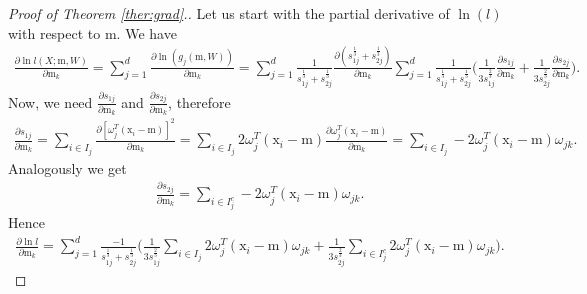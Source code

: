 \documentclass[12pt]{article}
\def\w{\omega}
\def\v{\mathrm{V}}
\def\x{\mathrm{x}}
\def\m{\mathrm{m}}
\theoremstyle{definition}
\begin{document}
\begin{proof}[Proof of Theorem \ref{ther:grad}.]
Let us start with the partial derivative of $\ln({l})$ with respect to $\m$. We have
$$
\begin{array}{l}
\frac{\partial \ln {l}(X;\m,W)}{\partial \m_k} =
\sum \limits_{j=1}^d \frac{\partial \ln ({g}_j(\m,W))}{\partial \m_k} = \sum\limits_{j=1}^d \frac{1}{{s}_{1j}^{\frac{1}{3}} + {s}_{2j}^{\frac{1}{3}}} \frac{\partial ({s}_{1j}^{\frac{1}{3}} + {s}_{2j}^{\frac{1}{3}})}{\partial \m_k} %
 \sum \limits_{j=1}^d \frac{1}{{s}_{1j}^{\frac{1}{3}} + {s}_{2j}^{\frac{1}{3}}} \bigg(
\frac{1}{3 {s}_{1j}^{\frac{2}{3}}} \frac{\partial {s}_{1j}}{\partial \m_k} +
\frac{1}{3 {s}_{2j}^{\frac{2}{3}}} \frac{\partial {s}_{2j}}{\partial \m_k}
\bigg).
\end{array}
$$
Now, we need $\frac{\partial {s}_{1j}}{\partial \m_k}$ and $\frac{\partial {s}_{2j}}{\partial \m_k}$, therefore
$$
\begin{array}{l}
\frac{\partial {s}_{1j}}{\partial \m_k} = 
\sum\limits_{i \in {I}_j} \frac{\partial [\w^T_j (\x_i - \m)]^2}{\partial \m_k} = \sum\limits_{i \in {I}_j} 2 \w^T_j (\x_i - \m) \frac{\partial \w^T_j (\x_i - \m)}{\partial \m_k} = %
 \sum\limits_{i \in {I}_j} - 2 \w^T_j (\x_i - \m) \w_{jk}.
\end{array}
$$
Analogously we get
$$
\begin{array}{l}
\frac{\partial {s}_{2j}}{\partial \m_k} = \sum\limits_{i \in {I}_j^c} -2 \w^T_j (\x_i - \m) \w_{jk}.
\end{array}
$$
Hence 
$$
\begin{array}{l}
\frac{\partial \ln {l}}{\partial \m_k} =\sum\limits_{j=1}^d \frac{-1}{{s}_{1j}^{\frac{1}{3}} + {s}_{2j}^{\frac{1}{3}}} \bigg(
\frac{1}{3 {s}_{1j}^{\frac{2}{3}}} \sum\limits_{i \in I_j} 2 \w_j^T (\x_i - \m)  \w_{jk} +%
\frac{1}{3 {s}_{2j}^{\frac{2}{3}}} \sum\limits_{i \in I_j^c} 2 \w_j^T (\x_i - \m) \w_{jk}
\bigg).
\end{array}
$$


\end{proof}
\end{document}
